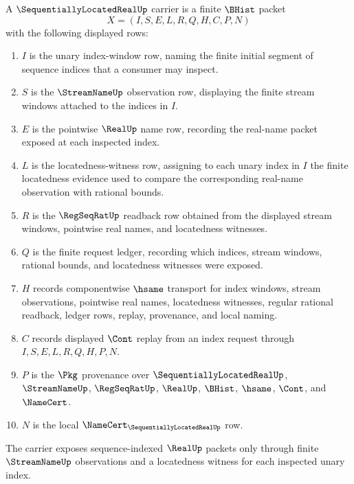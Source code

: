 \begin{definition}
\label{def:sequentially-located-real-carrier}
A $\SequentiallyLocatedRealUp$ carrier is a finite $\BHist$ packet
$$
X=(I,S,E,L,R,Q,H,C,P,N)
$$
with the following displayed rows:
\begin{enumerate}
\item $I$ is the unary index-window row, naming the finite initial segment of sequence indices that a consumer may inspect.
\item $S$ is the $\StreamNameUp$ observation row, displaying the finite stream windows attached to the indices in $I$.
\item $E$ is the pointwise $\RealUp$ name row, recording the real-name packet exposed at each inspected index.
\item $L$ is the locatedness-witness row, assigning to each unary index in $I$ the finite locatedness evidence used to compare the corresponding real-name observation with rational bounds.
\item $R$ is the $\RegSeqRatUp$ readback row obtained from the displayed stream windows, pointwise real names, and locatedness witnesses.
\item $Q$ is the finite request ledger, recording which indices, stream windows, rational bounds, and locatedness witnesses were exposed.
\item $H$ records componentwise $\hsame$ transport for index windows, stream observations, pointwise real names, locatedness witnesses, regular rational readback, ledger rows, replay, provenance, and local naming.
\item $C$ records displayed $\Cont$ replay from an index request through $I,S,E,L,R,Q,H,P,N$.
\item $P$ is the $\Pkg$ provenance over $\SequentiallyLocatedRealUp$, $\StreamNameUp$, $\RegSeqRatUp$, $\RealUp$, $\BHist$, $\hsame$, $\Cont$, and $\NameCert$.
\item $N$ is the local $\NameCert_{\SequentiallyLocatedRealUp}$ row.
\end{enumerate}
The carrier exposes sequence-indexed $\RealUp$ packets only through finite $\StreamNameUp$ observations and a locatedness witness for each inspected unary index.
\end{definition}

